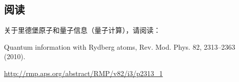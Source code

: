 \subsection*{阅读}

关于里德堡原子和量子信息（量子计算），请阅读：

Quantum information with Rydberg atoms, Rev. Mod. Phys. 82,
2313–2363 (2010).

\url{http://rmp.aps.org/abstract/RMP/v82/i3/p2313_1}